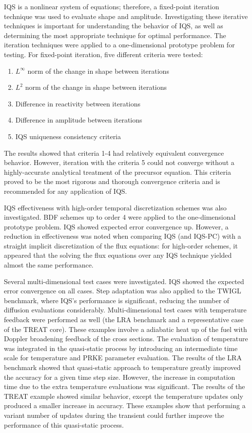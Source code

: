\documentclass{elsarticle}
\newcommand{\iqspc}{IQS-PC\xspace}
\begin{document}
IQS is a nonlinear system of equations; therefore, a fixed-point iteration technique was used to evaluate shape and amplitude. Investigating these iterative techniques is important for understanding the behavior of IQS, as well as determining the most appropriate technique for optimal performance. The iteration techniques were applied to a one-dimensional prototype problem for testing. For fixed-point iteration, five different criteria were tested: 
\begin{enumerate}
\item $L^\infty$ norm of the change in shape between iterations
\item $L^2$ norm of the change in shape between iterations
\item Difference in reactivity between iterations
\item Difference in amplitude between iterations
\item IQS uniqueness consistency criteria
\end{enumerate}
The results showed that criteria 1-4 had relatively equivalent convergence behavior. However, iteration with the criteria 5 could not converge without a highly-accurate analytical treatment of the precursor equation. This criteria proved to be the most rigorous and thorough convergence criteria and is recommended for any application of IQS.

IQS effectiveness with high-order temporal discretization schemes was also investigated. BDF schemes up to order 4 were applied to the one-dimensional prototype problem. IQS showed expected error convergence up. However,
a reduction in effectiveness was noted when comparing IQS (and \iqspc) with a straight implicit discretization of the flux equations: for high-order schemes, it appeared that the solving the flux equations over any IQS technique yielded 
almost the same performance.

Several multi-dimensional test cases were investigated. IQS showed the expected error convergence on all cases. Step adaptation was also applied to the TWIGL benchmark, where IQS's performance is significant, reducing the number of diffusion evaluations considerably. 
Multi-dimensional test cases with temperature feedback were performed as well (the LRA benchmark and a representative case of the TREAT core). 
These examples involve a adiabatic heat up of the fuel with Doppler broadening feedback of the cross sections. The evaluation of temperature was integrated in the quasi-static process by introducing an intermediate time scale for temperature and PRKE parameter evaluation. The results of the LRA benchmark showed that quasi-static approach to temperature greatly improved the accuracy for a given time step size. However, the increase in computation time due to the extra temperature evaluations was significant. The results of the TREAT example showed similar behavior, except the temperature updates only produced a smaller increase in accuracy. These examples show that performing a variant number of updates during the transient could further improve the performance of this quasi-static process. 
\end{document}
